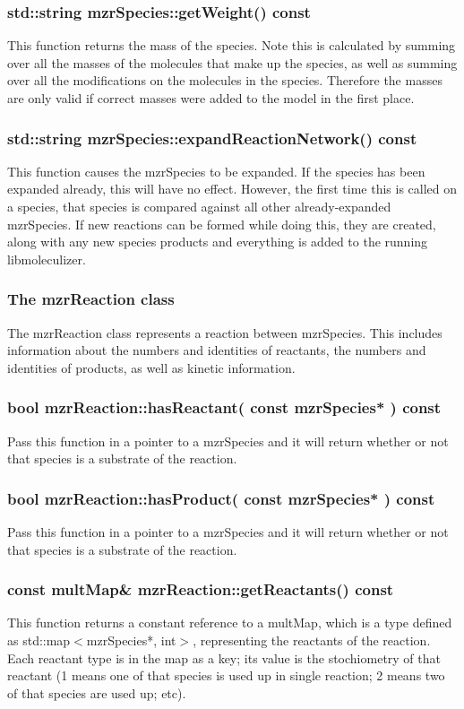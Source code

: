 \subsubsection{std::string mzrSpecies::getWeight() const }
This function returns the mass of the species.  Note this is
calculated by summing over all the masses of the molecules that make
up the species, as well as summing over all the modifications on the
molecules in the species.  Therefore the masses are only valid if
correct masses were added to the model in the first place.  

\subsubsection{std::string mzrSpecies::expandReactionNetwork() const }
This function causes the mzrSpecies to be expanded.  If the species
has been expanded already, this will have no effect.  However, the
first time this is called on a species, that species is compared
against all other already-expanded mzrSpecies.  If new reactions can
be formed while doing this, they are created, along with any new
species products and everything is added to the running libmoleculizer.

\subsubsection{The mzrReaction class }

The mzrReaction class represents a reaction between mzrSpecies.  This
includes information about the numbers and identities of reactants,
the numbers and identities of products, as well as kinetic
information.  

\subsubsection{bool mzrReaction::hasReactant( const mzrSpecies* )
  const }
Pass this function in a pointer to a mzrSpecies and it will return
whether or not that species is a substrate of the reaction.

\subsubsection{bool mzrReaction::hasProduct( const mzrSpecies* )
  const}
Pass this function in a pointer to a mzrSpecies and it will return
whether or not that species is a substrate of the reaction.

\subsubsection{const multMap\& mzrReaction::getReactants() const}
This function returns a constant reference to a multMap, which is a
type defined as std::map$<$mzrSpecies*, int$>$, representing the reactants
of the reaction.  Each reactant type is in the map as a key; its value
is the stochiometry of that reactant (1 means one of that species is
used up in single reaction; 2 means two of that species are used up;
etc).

